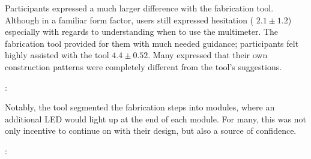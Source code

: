 \documentclass{sigchi}
\begin{document}

  Participants expressed a much larger difference with the fabrication tool. Although in a familiar form factor, users still expressed hesitation ( $2.1 \pm 1.2$) especially with regards to understanding when to use the multimeter. The fabrication tool provided for them with much needed guidance; participants felt highly assisted with the tool  $4.4 \pm 0.52$. Many expressed that their own construction patterns were completely different from the tool's suggestions.
  \begin{myquote}
   \vspace{-2pt}
    :
    \vspace{-2pt}
  \end{myquote}
  Notably, the tool segmented the fabrication steps into modules, where an additional LED would light up at the end of each module. For many, this was not only incentive to continue on with their design, but also a source of confidence.
  
  \begin{myquote}
   \vspace{-2pt}
    :
    \vspace{-2pt}
  \end{myquote}
  
\end{document}
